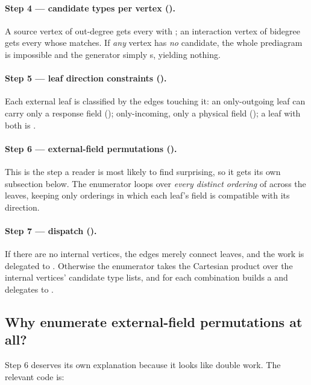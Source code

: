 \paragraph{Step 4 --- candidate types per vertex ().} A source
vertex of out-degree  gets every  with
; an interaction vertex of bidegree 
gets every  whose  matches. If
\emph{any} vertex has \emph{no} candidate, the whole prediagram is impossible and
the generator simply s, yielding nothing.

\paragraph{Step 5 --- leaf direction constraints ().} Each
external leaf is classified by the edges touching it: an only-outgoing leaf can
carry only a response field (); only-incoming, only a physical field
(); a leaf with both is .

\paragraph{Step 6 --- external-field permutations ().} This is
the step a reader is most likely to find surprising, so it gets its own
subsection below. The enumerator loops over \emph{every distinct ordering} of
 across the leaves, keeping only orderings in which each
leaf's field is compatible with its direction.

\paragraph{Step 7 --- dispatch ().} If there are no internal
vertices, the edges merely connect leaves, and the work is delegated to
. Otherwise the enumerator takes the
Cartesian product  over the internal vertices'
candidate type lists, and for each combination builds a 
and delegates to .

\subsection{Why enumerate external-field permutations at all?}

Step 6 deserves its own explanation because it looks like double work. The
relevant code is:

